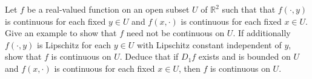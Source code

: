 Let $f$ be a real-valued function on an open subset $U$ of $\mathbb R^2$ such that that $f(\cdot,y)$ is continuous for each fixed $y\in U$ and $f(x,\cdot)$ is continuous for each fixed $x\in U$. Give an example to show that $f$ need not be continuous on $U$. If additionally $f(\cdot,y)$ is Lipschitz for each $y\in U$ with Lipschitz constant independent of $y$, show that $f$ is continuous on $U$. Deduce that if $D_1 f$ exists and is bounded on $U$ and $f(x,\cdot)$ is continuous for each fixed $x\in U$, then $f$ is continuous on $U$.
